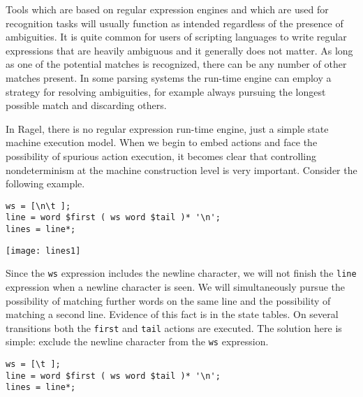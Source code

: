 \documentclass[letterpaper,11pt,oneside]{book}
\newcommand{\graphspace}{\vspace{10pt}}
\newenvironment{inline_code}{\def\baselinestretch{1}\vspace{12pt}\small}{}
\begin{document}
Tools which are based on regular expression engines and which are used for
recognition tasks will usually function as intended regardless of the presence
of ambiguities. It is quite common for users of scripting languages to write
regular expressions that are heavily ambiguous and it generally does not
matter. As long as one of the potential matches is recognized, there can be any
number of other matches present.  In some parsing systems the run-time engine
can employ a strategy for resolving ambiguities, for example always pursuing
the longest possible match and discarding others.

In Ragel, there is no regular expression run-time engine, just a simple state
machine execution model. When we begin to embed actions and face the
possibility of spurious action execution, it becomes clear that controlling
nondeterminism at the machine construction level is very important. Consider
the following example.

\begin{inline_code}
\begin{verbatim}
ws = [\n\t ];
line = word $first ( ws word $tail )* '\n';
lines = line*;
\end{verbatim}
\end{inline_code}

\begin{center}
\texttt{[image: lines1]}
\end{center}
\graphspace

Since the \verb|ws| expression includes the newline character, we will
not finish the \verb|line| expression when a newline character is seen. We will
simultaneously pursue the possibility of matching further words on the same
line and the possibility of matching a second line. Evidence of this fact is 
in the state tables. On several transitions both the \verb|first| and
\verb|tail| actions are executed.  The solution here is simple: exclude
the newline character from the \verb|ws| expression. 

\begin{inline_code}
\begin{verbatim}
ws = [\t ];
line = word $first ( ws word $tail )* '\n';
lines = line*;
\end{verbatim}
\end{inline_code}
\end{document}
